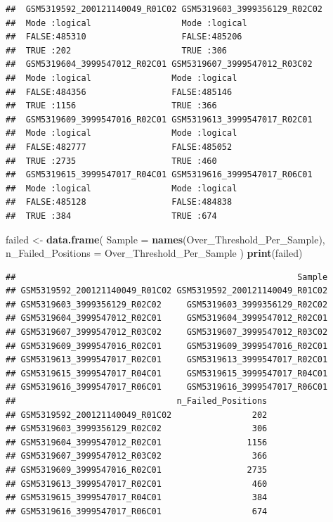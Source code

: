 \documentclass[
  11pt,
]{article}
\newenvironment{Shaded}{\begin{snugshade}}{\end{snugshade}}
\newcommand{\AttributeTok}[1]{\textcolor[rgb]{0.13,0.29,0.53}{#1}}
\newcommand{\FunctionTok}[1]{\textcolor[rgb]{0.13,0.29,0.53}{\textbf{#1}}}
\newcommand{\NormalTok}[1]{#1}
\newcommand{\OtherTok}[1]{\textcolor[rgb]{0.56,0.35,0.01}{#1}}
\begin{document}
\begin{verbatim}
##  GSM5319592_200121140049_R01C02 GSM5319603_3999356129_R02C02
##  Mode :logical                  Mode :logical               
##  FALSE:485310                   FALSE:485206                
##  TRUE :202                      TRUE :306                   
##  GSM5319604_3999547012_R02C01 GSM5319607_3999547012_R03C02
##  Mode :logical                Mode :logical               
##  FALSE:484356                 FALSE:485146                
##  TRUE :1156                   TRUE :366                   
##  GSM5319609_3999547016_R02C01 GSM5319613_3999547017_R02C01
##  Mode :logical                Mode :logical               
##  FALSE:482777                 FALSE:485052                
##  TRUE :2735                   TRUE :460                   
##  GSM5319615_3999547017_R04C01 GSM5319616_3999547017_R06C01
##  Mode :logical                Mode :logical               
##  FALSE:485128                 FALSE:484838                
##  TRUE :384                    TRUE :674
\end{verbatim}

\begin{Shaded}
\begin{Highlighting}[]
\NormalTok{failed }\OtherTok{\textless{}{-}} \FunctionTok{data.frame}\NormalTok{(}
  \AttributeTok{Sample =} \FunctionTok{names}\NormalTok{(Over\_Threshold\_Per\_Sample),}
  \AttributeTok{n\_Failed\_Positions =}\NormalTok{ Over\_Threshold\_Per\_Sample}
\NormalTok{)}
\FunctionTok{print}\NormalTok{(failed)}
\end{Highlighting}
\end{Shaded}

\begin{verbatim}
##                                                        Sample
## GSM5319592_200121140049_R01C02 GSM5319592_200121140049_R01C02
## GSM5319603_3999356129_R02C02     GSM5319603_3999356129_R02C02
## GSM5319604_3999547012_R02C01     GSM5319604_3999547012_R02C01
## GSM5319607_3999547012_R03C02     GSM5319607_3999547012_R03C02
## GSM5319609_3999547016_R02C01     GSM5319609_3999547016_R02C01
## GSM5319613_3999547017_R02C01     GSM5319613_3999547017_R02C01
## GSM5319615_3999547017_R04C01     GSM5319615_3999547017_R04C01
## GSM5319616_3999547017_R06C01     GSM5319616_3999547017_R06C01
##                                n_Failed_Positions
## GSM5319592_200121140049_R01C02                202
## GSM5319603_3999356129_R02C02                  306
## GSM5319604_3999547012_R02C01                 1156
## GSM5319607_3999547012_R03C02                  366
## GSM5319609_3999547016_R02C01                 2735
## GSM5319613_3999547017_R02C01                  460
## GSM5319615_3999547017_R04C01                  384
## GSM5319616_3999547017_R06C01                  674
\end{verbatim}
\end{document}
